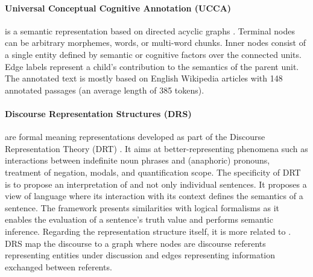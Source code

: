 

\paragraph{Universal Conceptual Cognitive Annotation (UCCA)} is a semantic representation based on directed acyclic graphs \parencite{abend2013universal}. Terminal nodes can be arbitrary morphemes, words, or multi-word chunks. Inner nodes consist of a single entity defined by semantic or cognitive factors over the connected units. Edge labels represent a child's contribution to the semantics of the parent unit. The annotated text is mostly based on English Wikipedia articles with 148 annotated passages  (an average length of 385 tokens).

\paragraph{Discourse Representation Structures (DRS)} are formal meaning representations developed as part of the Discourse Representation Theory (DRT) \parencite{kamp2013discourse}. It aims at better-representing phenomena such as interactions between indefinite noun phrases and (anaphoric) pronouns, treatment of negation, modals, and quantification scope. The specificity of DRT is to propose an interpretation of  and not only individual sentences. It proposes a view of language where its interaction with its context defines the semantics of a sentence. The framework presents similarities with logical formalisms as it enables the evaluation of a sentence's truth value and performs semantic inference. Regarding the representation structure itself, it is more related to . DRS map the discourse to a graph where nodes are discourse referents representing entities under discussion and edges representing information exchanged between referents.

